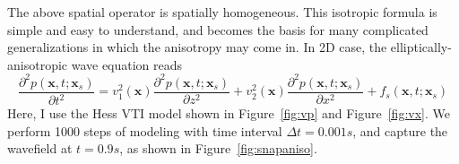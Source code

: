 % 
% 
% 





The above spatial operator is spatially homogeneous. This isotropic formula is simple and  easy to understand, and becomes the basis for many complicated generalizations in which the anisotropy may come in. In 2D case, the elliptically-anisotropic wave equation reads
\begin{equation}
 \frac{\partial^2 p(\textbf{x},t;\textbf{x}_s)}{\partial t^2}
 =v_1^2(\textbf{x})\frac{\partial^2 p(\textbf{x},t;\textbf{x}_s) }{\partial z^2} 
 +v_2^2(\textbf{x})\frac{\partial^2 p(\textbf{x},t;\textbf{x}_s)}{\partial x^2}+f_s(\textbf{x},t;\textbf{x}_s)
\end{equation}
Here, I use the Hess VTI model shown in Figure~\ref{fig:vp} and Figure~\ref{fig:vx}. We perform 1000 steps of modeling with time interval $\Delta t=0.001s$, and capture the wavefield at $t=0.9s$, as shown in Figure~\ref{fig:snapaniso}. 

% 
% 
% 

